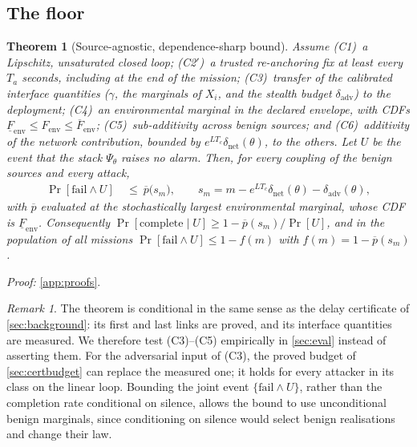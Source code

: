 \documentclass[letterpaper,twocolumn,10pt]{article}
\newcommand{\dnet}{\delta_{\mathrm{net}}}
\newcommand{\dadv}{\delta_{\mathrm{adv}}}
\newcommand{\pbar}{\overline{p}}
\newtheorem{theorem}{Theorem}
\theoremstyle{remark}
\newtheorem{remark}{Remark}
\begin{document}
\subsection{The floor}
\begin{theorem}[Source-agnostic, dependence-sharp bound]
\label{thm:floor}
Assume (C1)~a Lipschitz, unsaturated closed loop; (C2$'$)~a trusted re-anchoring
fix at least every $T_a$ seconds, including at the end of the mission; (C3)~transfer
of the calibrated interface quantities ($\gamma$, the marginals of $X_i$, and
the stealth budget $\dadv$) to the deployment; (C4)~an environmental marginal in
the declared envelope, with CDFs
$\underline F_{\mathrm{env}}\le F_{\mathrm{env}}\le\overline F_{\mathrm{env}}$;
(C5)~sub-additivity across benign sources; and (C6)~additivity of the network
contribution, bounded by $e^{LT_c}\dnet(\theta)$, to the others. Let $U$ be the event that the stack
$\Psi_\theta$ raises no alarm. Then, for every coupling of the benign sources and
every attack,
\begin{align}
\Pr[\text{fail}\wedge U]\ &\le\ \pbar\big(s_m\big),\qquad
s_m=m-e^{LT_c}\dnet(\theta)-\dadv(\theta),\label{eq:floor}
\end{align}
with $\pbar$ evaluated at the stochastically largest environmental marginal,
whose CDF is $\underline F_{\mathrm{env}}$. Consequently
$\Pr[\text{complete}\mid U]\ge1-\pbar(s_m)/\Pr[U]$, and in the population of
all missions $\Pr[\text{fail}\wedge U]\le1-f(m)$ with $f(m)=1-\pbar(s_m)$.
\end{theorem}
\noindent\emph{Proof:} \cref{app:proofs}.

\begin{remark}
The theorem is conditional in the same sense as the delay certificate of
\cref{sec:background}: its first and last links are proved, and its
interface quantities are measured. We therefore test (C3)--(C5) empirically
in \cref{sec:eval} instead of asserting them. For the adversarial input of (C3),
the proved budget of \cref{sec:certbudget} can replace the measured one; it
holds for every attacker in its class on the linear loop. Bounding the joint event
$\{\text{fail}\wedge U\}$, rather than the completion rate conditional on
silence, allows the bound to use unconditional benign marginals, since
conditioning on silence would select benign realisations and change their law.
\end{remark}
\end{document}
